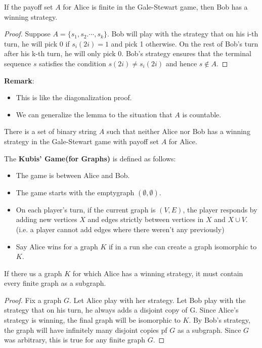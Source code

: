 \begin{lemma}
    If the payoff set $A$ for Alice is finite in the Gale-Stewart game, then Bob has a winning strategy.
\end{lemma}
\begin{proof}
    Suppose $A=\{s_1,s_2.\cdots,s_k\}$. Bob will play with the strategy that on his i-th turn, he will pick 0 if $s_i(2i)=1$ and pick 1 otherwise. 
    On the rest of Bob's turn after his k-th turn, he will only pick 0. 
    Bob's strategy ensures that the terminal sequence $s$ satisfies the condition $s(2i) \neq s_i(2i)$ and hence $s \notin A$.
\end{proof}
\textbf{Remark}:
\begin{itemize}
    \item This is like the diagonalization proof.
    \item We can generalize the lemma to the situation that $A$ is countable.
\end{itemize}


\begin{theorem}[*]
    There is a set of binary string $A$ such that neither Alice nor Bob has a winning strategy in the Gale-Stewart game with payoff set $A$ for Alice.
\end{theorem}


\begin{definition}
    The \textbf{Kubis' Game(for Graphs)} is defined as follows:
    \begin{itemize}
        \item The game is between Alice and Bob.
        \item The game starts with the emptygraph $(\emptyset, \emptyset)$.
        \item On each player's turn, if the current graph is $(V,E)$, the player responds by adding new vertices $X$ and edges strictly between vertices in $X$ and $X \cup V$.(i.e. a player cannot add edges where there weren't any previously)
        \item Say Alice wins for a graph $K$ if in a run she can create a graph isomorphic to $K$.
    \end{itemize}
\end{definition}


\begin{lemma}
    If there us a graph $K$ for which Alice has a winning strategy, it must contain every finite graph as a subgraph.
\end{lemma}
\begin{proof}
    Fix a graph $G$. Let Alice play with her strategy. 
    Let Bob play with the strategy that on his turn, he always adds a disjoint copy of G. 
    Since Alice's strategy is winning, the final graph will be isomorphic to $K$. 
    By Bob's strategy, the graph will have infinitely many disjoint copies pf $G$ as a subgraph. 
    Since $G$ was arbitrary, this is true for any finite graph $G$.
\end{proof}

